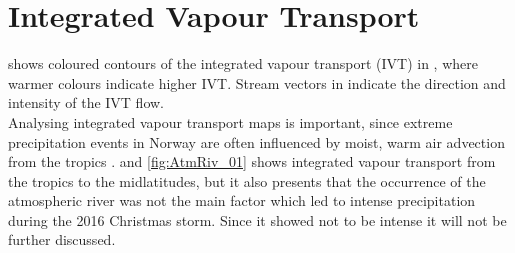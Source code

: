 \section{Integrated Vapour Transport}
\label{sec:weather:atm_riv}
 shows coloured contours of the integrated vapour transport (IVT) in \SI{}{\IVT}, where warmer colours indicate higher IVT. 
Stream vectors in  indicate the direction and intensity of the IVT flow. 
\\
Analysing integrated vapour transport maps is important, since extreme precipitation events in Norway are often influenced by moist, warm air advection from the tropics \citep{azad_extreme_2017}.  and \ref{fig:AtmRiv_01} shows integrated vapour transport from the tropics to the midlatitudes, but it also presents that the occurrence of the atmospheric river was not the main factor which led to intense precipitation during the 2016 Christmas storm. 
Since it showed not to be intense it will not be further discussed.

